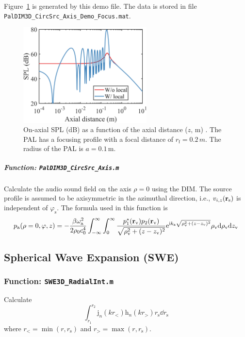 \documentclass[12pt]{article}
\begin{document}
Figure~\ref{fig:dim:focus:32oj4} is generated by this demo file.
The data is stored in file \lstinline!PalDIM3D_CircSrc_Axis_Demo_Focus.mat!.
\begin{figure}[!htb]
    \centering
    \includegraphics[width = 0.6\textwidth]{../code/DIM/fig/PalDIM3D_CircSrc_Axis_Demo_Focus.png}
    \caption{On-axial SPL (dB) as a function of the axial distance ($z$, m) \cite[Fig.~2(e)]{Zhong2022LowFrequencyAudio}.
        The PAL has a focusing profile with a focal distance of $r_\mathrm{f} = 0.2\,{m}$.
        The radius of the PAL is $a=0.1\,\mathrm{m}$.
    }
    \label{fig:dim:focus:32oj4}
\end{figure}

\subparagraph{Function: \lstinline!PalDIM3D_CircSrc_Axis.m!}
Calculate the audio sound field on the axis $\rho=0$ using the DIM.
The source profile is assumed to be axisymmetric in the azimuthal direction, i.e., $v_{i,z}(\vb{r}_\mathrm{s})$ is independent of $\varphi_\mathrm{s}$.
The formula used in this function is
\begin{equation}
    p_\mathrm{a}(\rho = 0, \varphi,z)
    =
    -\frac{\beta\omega_\mathrm{a}^2}{2\rho_0c_0^4}
    \int_{-\infty}^\infty \int_0^\infty
    \frac{p_1^*(\vb{r}_\mathrm{v})p_2(\vb{r}_\mathrm{v})}{\sqrt{\rho_\mathrm{v}^2 + (z-z_\mathrm{v})^2}} \mathrm{e}^{\mathrm{i}k_\mathrm{a} \sqrt{\rho_\mathrm{v}^2 + (z-z_\mathrm{v})^2}}
    \rho_\mathrm{v}\dd \rho_\mathrm{v}\dd z_\mathrm{v}
\end{equation}

\subsection{Spherical Wave Expansion (SWE)}

\subsubsection{Function: \lstinline!SWE3D_RadialInt.m!}
Calculate
\begin{equation}
    \int_{r_1}^{r_2}
    \mathrm{j}_n(kr_<)
    \mathrm{h}_n(kr_>)
    r_\mathrm{s}\dd r_\mathrm{s}
\end{equation}
where $r_<=\min(r,r_\mathrm{s})$ and $r_> = \max(r,r_\mathrm{s})$.
\end{document}

